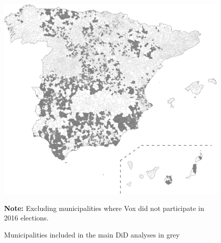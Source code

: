 \documentclass[12pt, titlepage]{article}
\begin{document}
\begin{figure}[htb!]
\centering

  \includegraphics[width = \textwidth]{img/map}

  \caption{Municipalities included in the main DiD analyses in grey}\label{fig:map}

    \vspace{5pt}

    \parbox[t]{0.8\textwidth}{\footnotesize{\textbf{Note:} Excluding municipalities where Vox did not participate in 2016 elections.}}

\end{figure}
\end{document}
